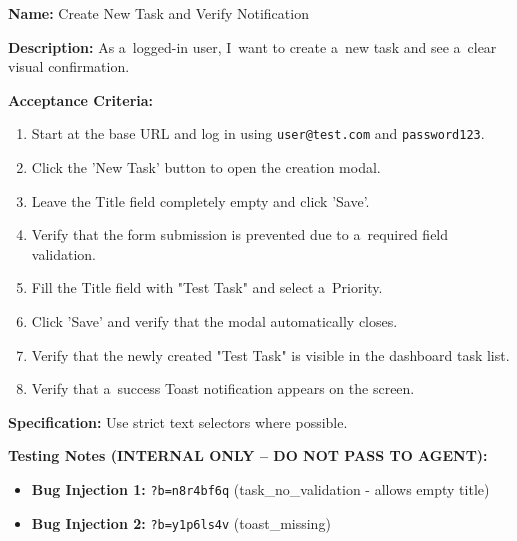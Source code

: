 \documentclass[czech, ing, kiv, he, iso690numb, viewonly]{fasthesis}
\begin{document}
\begin{tcolorbox}[breakable, colback=gray!4, colframe=black!35, boxrule=0.4pt, arc=2pt, boxsep=1pt, left=3pt, right=3pt, top=2pt, bottom=2pt, before skip=6pt, after skip=6pt, fontupper=\small, title={US-04 -- Create New Task and Verify Notification}]
\textbf{Name:} Create New Task and Verify Notification

\textbf{Description:} As a~logged-in user, I~want to create a~new task and see a~clear visual confirmation.

\textbf{Acceptance Criteria:}
\begin{enumerate}
    \item Start at the base URL and log in using \texttt{user@test.com} and \texttt{password123}.
    \item Click the 'New Task' button to open the creation modal.
    \item Leave the Title field completely empty and click 'Save'.
    \item Verify that the form submission is prevented due to a~required field validation.
    \item Fill the Title field with "Test Task" and select a~Priority.
    \item Click 'Save' and verify that the modal automatically closes.
    \item Verify that the newly created "Test Task" is visible in the dashboard task list.
    \item Verify that a~success Toast notification appears on the screen.
\end{enumerate}

\textbf{Specification:} Use strict text selectors where possible.

\textbf{\textcolor{BrickRed}{Testing Notes (INTERNAL ONLY -- DO NOT PASS TO AGENT):}}
\begin{itemize}
    \item \textbf{Bug Injection 1:} \texttt{?b=n8r4bf6q} (task\_no\_validation - allows empty title)
    \item \textbf{Bug Injection 2:} \texttt{?b=y1p6ls4v} (toast\_missing)
\end{itemize}
\end{tcolorbox}
\end{document}

